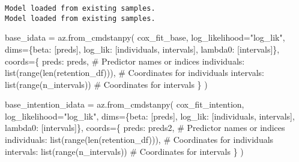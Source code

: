 \documentclass[
  letterpaper,
  DIV=11,
  numbers=noendperiod]{scrartcl}
\newenvironment{Shaded}{\begin{snugshade}}{\end{snugshade}}
\newcommand{\BuiltInTok}[1]{\textcolor[rgb]{0.00,0.23,0.31}{#1}}
\newcommand{\CommentTok}[1]{\textcolor[rgb]{0.37,0.37,0.37}{#1}}
\newcommand{\NormalTok}[1]{\textcolor[rgb]{0.00,0.23,0.31}{#1}}
\newcommand{\OperatorTok}[1]{\textcolor[rgb]{0.37,0.37,0.37}{#1}}
\newcommand{\StringTok}[1]{\textcolor[rgb]{0.13,0.47,0.30}{#1}}
\begin{document}
\begin{verbatim}
Model loaded from existing samples.
Model loaded from existing samples.
\end{verbatim}

\begin{Shaded}
\begin{Highlighting}[]
\NormalTok{base\_idata }\OperatorTok{=}\NormalTok{ az.from\_cmdstanpy(}
\NormalTok{    cox\_fit\_base,}
\NormalTok{    log\_likelihood}\OperatorTok{=}\StringTok{"log\_lik"}\NormalTok{,}
\NormalTok{    dims}\OperatorTok{=}\NormalTok{\{}\StringTok{\textquotesingle{}beta\textquotesingle{}}\NormalTok{: [}\StringTok{\textquotesingle{}preds\textquotesingle{}}\NormalTok{], }\StringTok{\textquotesingle{}log\_lik\textquotesingle{}}\NormalTok{: [}\StringTok{\textquotesingle{}individuals\textquotesingle{}}\NormalTok{, }\StringTok{\textquotesingle{}intervals\textquotesingle{}}\NormalTok{], }\StringTok{\textquotesingle{}lambda0\textquotesingle{}}\NormalTok{: [}\StringTok{\textquotesingle{}intervals\textquotesingle{}}\NormalTok{]\},}
\NormalTok{    coords}\OperatorTok{=}\NormalTok{\{}
        \StringTok{\textquotesingle{}preds\textquotesingle{}}\NormalTok{: preds,  }\CommentTok{\# Predictor names or indices}
        \StringTok{\textquotesingle{}individuals\textquotesingle{}}\NormalTok{: }\BuiltInTok{list}\NormalTok{(}\BuiltInTok{range}\NormalTok{(}\BuiltInTok{len}\NormalTok{(retention\_df))),  }\CommentTok{\# Coordinates for individuals}
        \StringTok{\textquotesingle{}intervals\textquotesingle{}}\NormalTok{: }\BuiltInTok{list}\NormalTok{(}\BuiltInTok{range}\NormalTok{(n\_intervals))  }\CommentTok{\# Coordinates for intervals}
\NormalTok{    \}}
\NormalTok{)}

\NormalTok{base\_intention\_idata }\OperatorTok{=}\NormalTok{ az.from\_cmdstanpy(}
\NormalTok{    cox\_fit\_intention,}
\NormalTok{    log\_likelihood}\OperatorTok{=}\StringTok{"log\_lik"}\NormalTok{,}
\NormalTok{    dims}\OperatorTok{=}\NormalTok{\{}\StringTok{\textquotesingle{}beta\textquotesingle{}}\NormalTok{: [}\StringTok{\textquotesingle{}preds\textquotesingle{}}\NormalTok{], }\StringTok{\textquotesingle{}log\_lik\textquotesingle{}}\NormalTok{: [}\StringTok{\textquotesingle{}individuals\textquotesingle{}}\NormalTok{, }\StringTok{\textquotesingle{}intervals\textquotesingle{}}\NormalTok{], }\StringTok{\textquotesingle{}lambda0\textquotesingle{}}\NormalTok{: [}\StringTok{\textquotesingle{}intervals\textquotesingle{}}\NormalTok{]\},}
\NormalTok{    coords}\OperatorTok{=}\NormalTok{\{}
        \StringTok{\textquotesingle{}preds\textquotesingle{}}\NormalTok{: preds2,  }\CommentTok{\# Predictor names or indices}
        \StringTok{\textquotesingle{}individuals\textquotesingle{}}\NormalTok{: }\BuiltInTok{list}\NormalTok{(}\BuiltInTok{range}\NormalTok{(}\BuiltInTok{len}\NormalTok{(retention\_df))),  }\CommentTok{\# Coordinates for individuals}
        \StringTok{\textquotesingle{}intervals\textquotesingle{}}\NormalTok{: }\BuiltInTok{list}\NormalTok{(}\BuiltInTok{range}\NormalTok{(n\_intervals))  }\CommentTok{\# Coordinates for intervals}
\NormalTok{    \}}
\NormalTok{)}
\end{Highlighting}
\end{Shaded}
\end{document}
